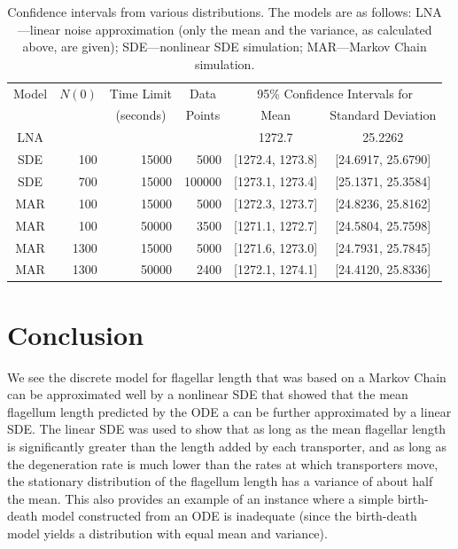 \documentclass[titlepage]{article}
\begin{document}
\begin{table}%
\centering
\begin{tabular}{c|rrr|cc}
 Model & \multicolumn{1}{c}{$N(0)$} & \multicolumn{1}{c}{Time Limit}
 & \multicolumn{1}{c}{Data} &
 \multicolumn{2}{c}{95\% Confidence Intervals for} \\
 & & \multicolumn{1}{c}{(seconds)} & \multicolumn{1}{c}{Points}
 & \multicolumn{1}{c}{Mean} &
 \multicolumn{1}{c}{Standard Deviation}
\\ \hline
 LNA & & & & 1272.7 & 25.2262 \\
 SDE & 100 & 15000 & 5000 & [1272.4, 1273.8] & [24.6917, 25.6790] \\
 SDE & 700 & 15000 & 100000 & [1273.1, 1273.4] & [25.1371, 25.3584]\\
 MAR & 100 & 15000 & 5000 & [1272.3, 1273.7] & [24.8236, 25.8162] \\
 MAR & 100 & 50000 & 3500 & [1271.1, 1272.7] & [24.5804, 25.7598] \\
 MAR & 1300 & 15000 & 5000 & [1271.6, 1273.0] & [24.7931, 25.7845] \\
 MAR & 1300 & 50000 & 2400 & [1272.1, 1274.1] & [24.4120, 25.8336]

\end{tabular}
\caption{Confidence intervals from various distributions.
The models are as follows:
LNA---linear noise approximation (only the mean and the variance, as calculated above, are given);
SDE---nonlinear SDE simulation;
MAR---Markov Chain simulation.}
\label{tab:ci}
\end{table}

\section{Conclusion}

We see the discrete model for flagellar length that was based on a Markov Chain can be approximated well by a nonlinear SDE that showed that the mean flagellum length predicted by the ODE a can be further approximated by a linear SDE.
The linear SDE was used to show that as long as the mean flagellar length is significantly greater than the length added by each transporter, and as long as the degeneration rate is much lower than the rates at which transporters move, the stationary distribution of the flagellum length has a variance of about half the mean.
This also provides an example of an instance where a simple birth-death model constructed from an ODE is inadequate (since the birth-death model yields a distribution with equal mean and variance).
\end{document}
